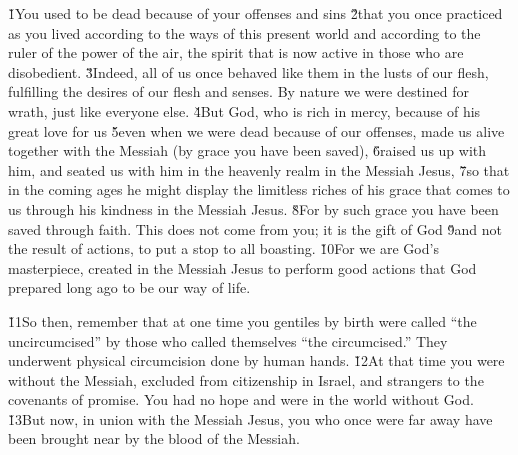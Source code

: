 \v{1}You used to be dead because of your offenses and sins \v{2}that you once practiced as you lived according to the ways of this present world and according to the ruler of the power of the air, the spirit that is now active in those who are disobedient. \v{3}Indeed, all of us once behaved like them in the lusts of our flesh, fulfilling the desires of our flesh and senses. By nature we were destined for wrath, just like everyone else. \v{4}But God, who is rich in mercy, because of his great love for us \v{5}even when we were dead because of our offenses, made us alive together with the Messiah (by grace you have been saved), \v{6}raised us up with him, and seated us with him in the heavenly realm in the Messiah Jesus, \v{7}so that in the coming ages he might display the limitless riches of his grace that comes to us through his kindness in the Messiah Jesus. \v{8}For by such grace you have been saved through faith. This does not come from you; it is the gift of God \v{9}and not the result of actions, to put a stop to all boasting. \v{10}For we are God's masterpiece, created in the Messiah Jesus to perform good actions that God prepared long ago to be our way of life.

\v{11}So then, remember that at one time you gentiles by birth were called ``the uncircumcised'' by those who called themselves ``the circumcised.'' They underwent physical circumcision done by human hands. \v{12}At that time you were without the Messiah, excluded from citizenship in Israel, and strangers to the covenants of promise. You had no hope and were in the world without God. \v{13}But now, in union with the Messiah Jesus, you who once were far away have been brought near by the blood of the Messiah.

